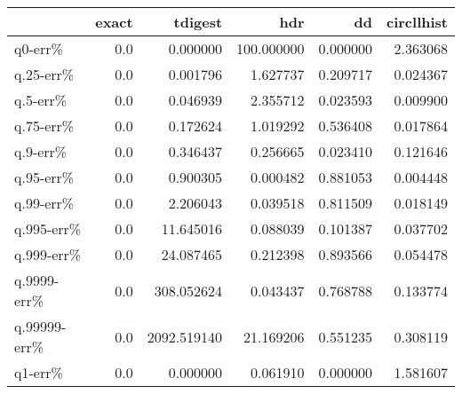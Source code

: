 \begin{tabular}{lrrrrr}
\toprule
{} &  exact &      tdigest &         hdr &        dd &  circllhist \\
\midrule
q0-err\%      &    0.0 &     0.000000 &  100.000000 &  0.000000 &    2.363068 \\
q.25-err\%    &    0.0 &     0.001796 &    1.627737 &  0.209717 &    0.024367 \\
q.5-err\%     &    0.0 &     0.046939 &    2.355712 &  0.023593 &    0.009900 \\
q.75-err\%    &    0.0 &     0.172624 &    1.019292 &  0.536408 &    0.017864 \\
q.9-err\%     &    0.0 &     0.346437 &    0.256665 &  0.023410 &    0.121646 \\
q.95-err\%    &    0.0 &     0.900305 &    0.000482 &  0.881053 &    0.004448 \\
q.99-err\%    &    0.0 &     2.206043 &    0.039518 &  0.811509 &    0.018149 \\
q.995-err\%   &    0.0 &    11.645016 &    0.088039 &  0.101387 &    0.037702 \\
q.999-err\%   &    0.0 &    24.087465 &    0.212398 &  0.893566 &    0.054478 \\
q.9999-err\%  &    0.0 &   308.052624 &    0.043437 &  0.768788 &    0.133774 \\
q.99999-err\% &    0.0 &  2092.519140 &   21.169206 &  0.551235 &    0.308119 \\
q1-err\%      &    0.0 &     0.000000 &    0.061910 &  0.000000 &    1.581607 \\
\bottomrule
\end{tabular}
